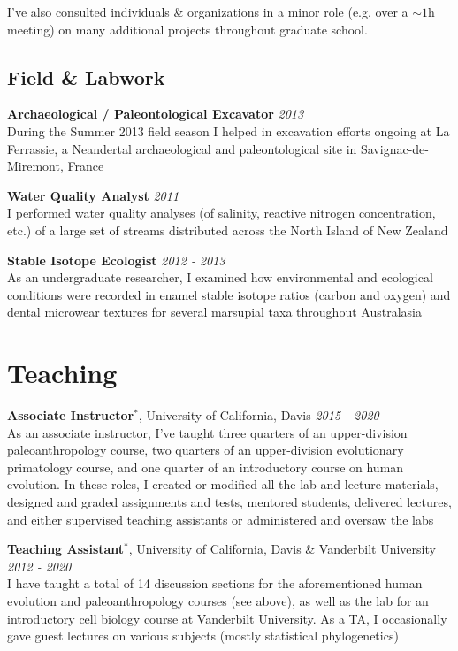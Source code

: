 \documentclass[12pt]{article}
\begin{document}
I've also consulted individuals \& organizations in a minor role (e.g. over a $\sim 1$h meeting) on many additional projects throughout graduate school.

\subsection{Field \& Labwork}

\textbf{Archaeological / Paleontological Excavator} \hfill \emph{2013}\\
During the Summer 2013 field season I helped in excavation efforts ongoing at La Ferrassie, a Neandertal archaeological and paleontological site in Savignac-de-Miremont, France


\textbf{Water Quality Analyst} \hfill \emph{2011}\\
I performed water quality analyses (of salinity, reactive nitrogen concentration, etc.) of a large set of streams distributed across the North Island of New Zealand

\textbf{Stable Isotope Ecologist} \hfill \emph{2012 - 2013}\\
As an undergraduate researcher, I examined how environmental and ecological conditions were recorded in enamel stable isotope ratios (carbon and oxygen) and dental microwear textures for several marsupial taxa throughout Australasia

\section{Teaching}

\textbf{Associate Instructor$^{*}$}, University of California, Davis \hfill \emph{2015  - 2020}\\
As an associate instructor, I’ve taught three quarters of an upper-division paleoanthropology course, two quarters of an upper-division evolutionary primatology course, and one quarter of an introductory course on human evolution. In these roles, I created or modified all the lab and lecture materials, designed and graded assignments and tests, mentored students, delivered lectures, and either supervised teaching assistants or administered and oversaw the labs

\textbf{Teaching Assistant$^{*}$}, University of California, Davis \& Vanderbilt University \hfill \emph{2012  - 2020}\\
I have taught a total of 14 discussion sections for the aforementioned human evolution and paleoanthropology courses (see above), as well as the lab for an introductory cell biology course at Vanderbilt University. As a TA, I occasionally gave guest lectures on various subjects (mostly statistical phylogenetics)
\end{document}

